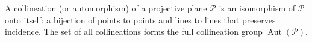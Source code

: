 A collineation (or automorphism) of a projective plane $\mathcal{P}$ is an isomorphism of $\mathcal{P}$ onto itself: a bijection of points to points and lines to lines that preserves incidence. The set of all collineations forms the full collineation group $\operatorname{Aut}(\mathcal{P})$.
